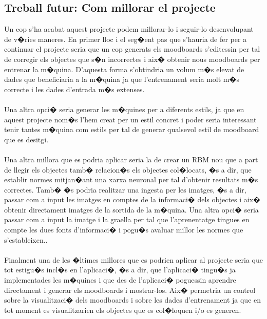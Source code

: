 \documentclass[12pt,a4paper,openright,oneside]{article}
\numberwithin{equation}{section}
\theoremstyle{definition}
\begin{document}
\subsection{Treball futur: Com millorar el projecte}
Un cop s'ha acabat aquest projecte podem millorar-lo i seguir-lo desenvolupant de v�ries maneres. En primer lloc i el seg�ent pas que s'hauria de fer per a continuar el projecte seria que un cop generats els moodboards s'editessin per tal de corregir els objectes que s�n incorrectes i aix� obtenir nous moodboards per entrenar la m�quina. D'aquesta forma s'obtindria un volum m�s elevat de dades que beneficiaria a la m�quina ja que l'entrenament seria molt m�s correcte i les dades d'entrada m�s extenses.\\\\
Una altra opci� seria generar les m�quines per a diferents estils, ja que en aquest projecte nom�s l'hem creat per un estil concret i poder seria interessant tenir tantes m�quina com estils per tal de generar qualsevol estil de moodboard que es desitgi. \\\\
Una altra millora que es podria aplicar seria la de crear un RBM nou que a part de llegir els objectes tamb� relacion�s els objectes col�locats, �s a dir, que establir normes mitjan�ant una xarxa neuronal per tal d'obtenir resultats m�s correctes. Tamb� �s podria realitzar una ingesta per les imatges, �s a dir, passar com a input les imatges en comptes de la informaci� dels objectes i aix� obtenir directament imatges de la sortida de la m�quina. Una altra opci� seria passar com a input la imatge i la graella per tal que l'aprenentatge tingues en compte les dues fonts d'informaci� i pogu�s avaluar millor les normes que s'estableixen..  \\\\
Finalment una de les �ltimes millores que es podrien aplicar al projecte seria que tot estigu�s incl�s en l'aplicaci�, �s a dir, que l'aplicaci� tingu�s ja implementades les m�quines i que des de l'aplicaci� poguessin aprendre directament i generar els moodboards i mostrar-los. Aix� permetria un control sobre la visualitzaci� dels moodboards i sobre les dades d'entrenament ja que en tot moment es visualitzarien els objectes que es col�loquen i/o es generen.
\normalfont

\newpage
\end{document}
